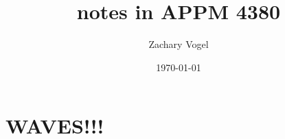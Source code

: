 \documentclass{article}
\author{Zachary Vogel}
\title{notes in APPM 4380}
\date{\today}
\begin{document}
\maketitle
\section{WAVES!!!}
\end{document}
